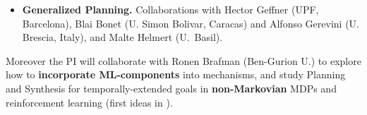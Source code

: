 \begin{itemize}
\item \textbf{Generalized Planning.}
Collaborations with Hector Geffner (UPF, Barcelona), Blai
Bonet (U. Simon Bolivar, Caracas) and Alfonso Gerevini (U. Brescia,
Italy), and Malte Helmert (U.\ Basil).


\end{itemize}

Moreover the PI will collaborate 
with Ronen Brafman (Ben-Gurion U.) to
explore how to \textbf{incorporate ML-components} into mechanisms, and study
Planning and Synthesis for temporally-extended goals in \textbf{non-Markovian} MDPs
and reinforcement learning (first ideas in
\cite{BeckL12,Lacerda0H15,BDMS17}).


